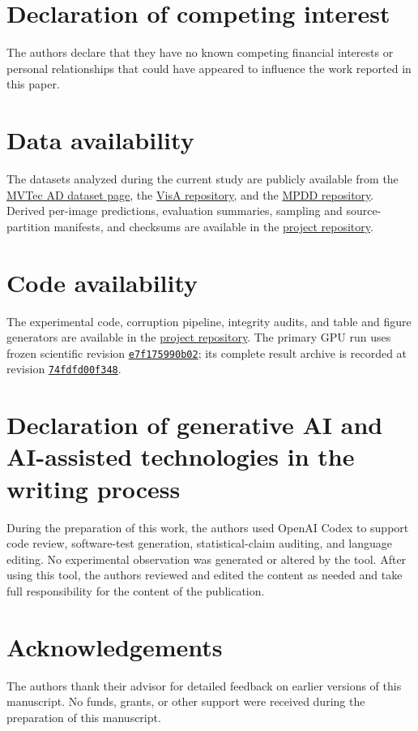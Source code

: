 
\section*{Declaration of competing interest}
The authors declare that they have no known competing financial interests or personal relationships that could have appeared to influence the work reported in this paper.

\section*{Data availability}
The datasets analyzed during the current study are publicly available from the \href{https://www.mvtec.com/company/research/datasets/mvtec-ad}{MVTec AD dataset page}, the \href{https://github.com/amazon-science/spot-diff}{VisA repository}, and the \href{https://github.com/stepanje/MPDD}{MPDD repository}. Derived per-image predictions, evaluation summaries, sampling and source-partition manifests, and checksums are available in the \href{https://github.com/OxyzGiaHuy/AD}{project repository}.

\section*{Code availability}
The experimental code, corruption pipeline, integrity audits, and table and figure generators are available in the \href{https://github.com/OxyzGiaHuy/AD}{project repository}. The primary GPU run uses frozen scientific revision \href{https://github.com/OxyzGiaHuy/AD/commit/e7f175990b02aa3cbdb7c92250d57c0272abef9d}{\texttt{e7f175990b02}}; its complete result archive is recorded at revision \href{https://github.com/OxyzGiaHuy/AD/commit/74fdfd00f3480f3bc5db42e29bc51ec0768ab881}{\texttt{74fdfd00f348}}.

\section*{Declaration of generative AI and AI-assisted technologies in the writing process}
During the preparation of this work, the authors used OpenAI Codex to support code review, software-test generation, statistical-claim auditing, and language editing. No experimental observation was generated or altered by the tool. After using this tool, the authors reviewed and edited the content as needed and take full responsibility for the content of the publication.

\section*{Acknowledgements}
The authors thank their advisor for detailed feedback on earlier versions of this manuscript. No funds, grants, or other support were received during the preparation of this manuscript.
